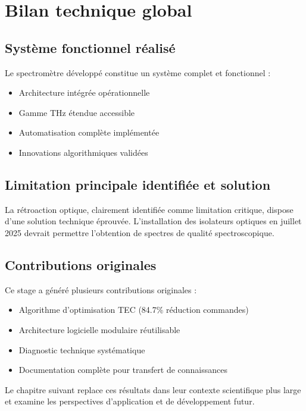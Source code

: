 \section{Bilan technique global}

\subsection{Système fonctionnel réalisé}

Le spectromètre développé constitue un système complet et fonctionnel :
\begin{itemize}
    \item Architecture intégrée opérationnelle
    \item Gamme THz étendue accessible
    \item Automatisation complète implémentée
    \item Innovations algorithmiques validées
\end{itemize}

\subsection{Limitation principale identifiée et solution}

La rétroaction optique, clairement identifiée comme limitation critique, dispose d'une solution technique éprouvée. L'installation des isolateurs optiques en juillet 2025 devrait permettre l'obtention de spectres de qualité spectroscopique.

\subsection{Contributions originales}

Ce stage a généré plusieurs contributions originales :
\begin{itemize}
    \item Algorithme d'optimisation TEC (84.7\% réduction commandes)
    \item Architecture logicielle modulaire réutilisable
    \item Diagnostic technique systématique
    \item Documentation complète pour transfert de connaissances
\end{itemize}

Le chapitre suivant replace ces résultats dans leur contexte scientifique plus large et examine les perspectives d'application et de développement futur.